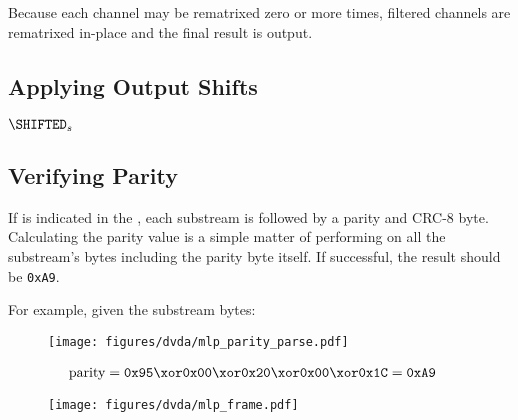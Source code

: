 Because each channel may be rematrixed zero or more times,
filtered channels are rematrixed in-place
and the final result is output.


\clearpage

\subsection{Applying Output Shifts}
\label{mlp:output_shifts}
\Return $\text{\SHIFTED}_{s}$\;
\EALGORITHM

\clearpage

\subsection{Verifying Parity}
\label{mlp:verify_parity}
If  is indicated in the ,
each substream is followed by a parity and CRC-8 byte.
Calculating the parity value is a simple matter of performing
\xor on all the substream's bytes including the parity byte itself.
If successful, the result should be \texttt{0xA9}.
\par
For example, given the substream bytes:
\begin{figure}[h]
  \texttt{[image: figures/dvda/mlp\_parity\_parse.pdf]}
\end{figure}
\begin{align*}
  \text{parity} &= \texttt{0x95} \xor \texttt{0x00} \xor \texttt{0x20} \xor \texttt{0x00} \xor \texttt{0x1C} = \texttt{0xA9}
\end{align*}

\begin{figure}[h]
  \texttt{[image: figures/dvda/mlp\_frame.pdf]}
\end{figure}

\clearpage

